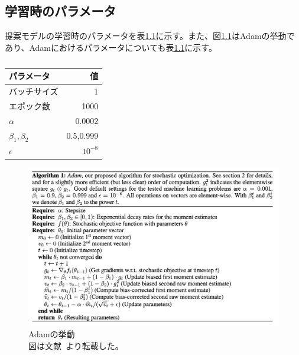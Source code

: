 \appendix
\chapter{}

\section{学習時のパラメータ}
\label{sec:appendix_params}


提案モデルの学習時のパラメータを表\ref{tab:params}に示す。また、図\ref{fig:Adam}はAdamの挙動であり、Adamにおけるパラメータについても表\ref{tab:params}に示す。

\begin{table}[h]
\label{tab:params}
\caption{}
\begin{center}
    \begin{tabular}{lr}\toprule
        パラメータ & 値 \\ \midrule
        バッチサイズ & 1 \\ 
        エポック数 & 1000 \\ 
        $\alpha$ & 0.0002 \\ 
        $\beta_1,\beta_2$ & 0.5,0.999 \\
        $\epsilon$ & $10^{-8}$ \\ \bottomrule
    \end{tabular}
\end{center}
\end{table}

\begin{figure}[b]
\begin{center}
\includegraphics[width=0.9\hsize]{figure/Adam.png}
\caption{Adamの挙動\\
図は文献~\cite{Adam}より転載した。}
\label{fig:Adam}
\end{center}
\end{figure}

